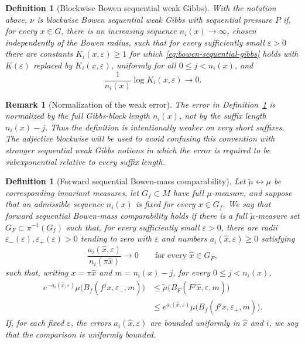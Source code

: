 \documentclass[11pt,a4paper]{article}
\newtheorem{remark}[theorem]{Remark}
\newtheorem{definition}[theorem]{Definition}
\newcommand{\eps}{\varepsilon}
\begin{document}
\begin{definition}[Blockwise Bowen sequential weak Gibbs]
\label{def:bowen-sequential-weak}
With the notation above, $\nu$ is \emph{blockwise Bowen sequential weak
Gibbs} with sequential pressure $P$ if, for every $x\in G$, there is an
increasing sequence $n_i(x)\to\infty$, chosen independently of the Bowen
radius, such that for every sufficiently small $\eps>0$ there are constants
$K_i(x,\eps)\ge1$ for which \eqref{eq:bowen-sequential-gibbs} holds with
$K(\eps)$ replaced by $K_i(x,\eps)$, uniformly for all
$0\le j<n_i(x)$, and
\begin{equation}
 \frac{1}{n_i(x)}\log K_i(x,\eps)\longrightarrow0.
 \label{eq:sequential-weak-subexp}
\end{equation}
\end{definition}

\begin{remark}[Normalization of the weak error]
The error in Definition~\ref{def:bowen-sequential-weak} is normalized by the
full Gibbs-block length $n_i(x)$, not by the suffix length $n_i(x)-j$. Thus the
definition is intentionally weaker on very short suffixes. The adjective
\emph{blockwise} will be used to avoid confusing this convention with stronger
sequential weak Gibbs notions in which the error is required to be
subexponential relative to every suffix length.
\end{remark}

\begin{definition}[Forward sequential Bowen-mass comparability]
\label{def:sequential-forward-comparison}
Let $\widetilde\mu\leftrightarrow\mu$ be corresponding invariant measures,
let $G_f\subset M$ have full $\mu$-measure, and suppose that an admissible
sequence $n_i(x)$ is fixed for every $x\in G_f$. We say that \emph{forward
sequential Bowen-mass comparability} holds if there is a full
$\widetilde\mu$-measure set $G_F\subset\pi^{-1}(G_f)$ such that, for every
sufficiently small $\eps>0$, there are radii
$\eps_-(\eps),\eps_+(\eps)>0$ tending to zero with $\eps$ and numbers
$a_i(\hat x,\eps)\ge0$ satisfying
\begin{equation}
 \frac{a_i(\hat x,\eps)}{n_i(\pi\hat x)}\longrightarrow0
 \qquad\text{for every }\hat x\in G_F,
 \label{eq:seq-mass-error-subexp}
\end{equation}
such that, writing $x=\pi\hat x$ and $m=n_i(x)-j$, for every
$0\le j<n_i(x)$,
\begin{align}
 e^{-a_i(\hat x,\eps)}
 \mu\bigl(B_f(f^jx,\eps_-,m)\bigr)
 &\le
 \widetilde\mu\bigl(B_F(F^j\hat x,\eps,m)\bigr)
 \nonumber\\
 &\le
 e^{a_i(\hat x,\eps)}
 \mu\bigl(B_f(f^jx,\eps_+,m)\bigr).
 \label{eq:seq-forward-comparison}
\end{align}
If, for each fixed $\eps$, the errors $a_i(\hat x,\eps)$ are bounded
uniformly in $\hat x$ and $i$, we say that the comparison is
\emph{uniformly bounded}.
\end{definition}
\end{document}
